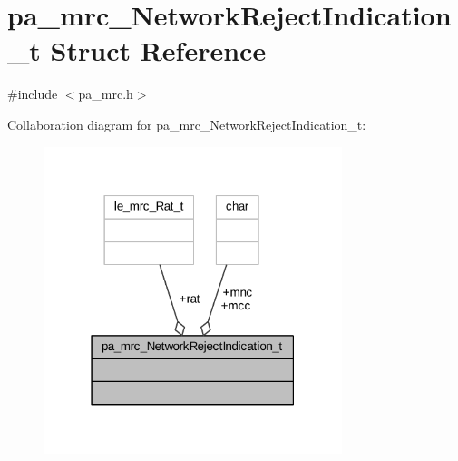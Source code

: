 \hypertarget{structpa__mrc___network_reject_indication__t}{}\section{pa\+\_\+mrc\+\_\+\+Network\+Reject\+Indication\+\_\+t Struct Reference}
\label{structpa__mrc___network_reject_indication__t}


{\ttfamily \#include $<$pa\+\_\+mrc.\+h$>$}



Collaboration diagram for pa\+\_\+mrc\+\_\+\+Network\+Reject\+Indication\+\_\+t\+:
\nopagebreak
\begin{figure}[H]
\begin{center}
\leavevmode
\includegraphics[width=247pt]{structpa__mrc___network_reject_indication__t__coll__graph}
\end{center}
\end{figure}
